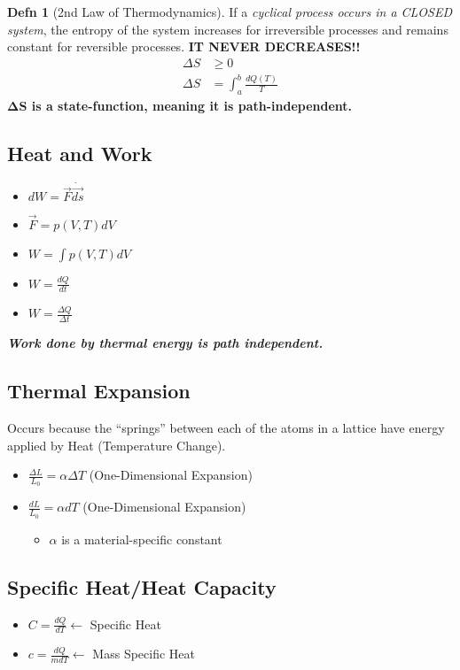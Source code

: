 \documentclass[10pt,letterpaper,final,twoside,notitlepage]{article}
\numberwithin{equation}{section} %
\theoremstyle{definition}
\newtheorem{definition}{Defn}
\theoremstyle{remark}
\begin{document}
		\begin{definition}[2nd Law of Thermodynamics] \label{def:2nd Law of Thermo}
			If a \emph{cyclical process occurs in a CLOSED system}, the entropy of the system increases for irreversible processes and remains constant for reversible processes. \textbf{IT NEVER DECREASES!!}
			\begin{align} \label{eq:2nd Law of Thermo}
				\Delta S &\geq 0 \\
				\Delta S &= \int_{a}^{b} \frac{dQ \left( T \right)}{T} 
			\end{align}
			\textbf{$\mathbf{\Delta S}$ is a state-function, meaning it is path-independent.}
		\end{definition}
	
	\subsection*{Heat and Work} \label{subsec:Heat/Work}
		\begin{itemize}[noitemsep, nolistsep]
			\item $dW = \vec{F} \dot \vec{ds}$
			\item $\vec{F} = p \left( V, T \right) dV$
			\item $W = \int p \left( V, T \right) dV$
			\item $W = \frac{dQ}{dt}$
			\item $W = \frac{\Delta Q}{\Delta t}$
		\end{itemize}
	\emph{\textbf{Work done by thermal energy is path independent.}}

	\subsection*{Thermal Expansion} \label{subsec:Thermal Expansion}
	Occurs because the ``springs'' between each of the atoms in a lattice have energy applied by Heat (Temperature Change).
		\begin{itemize}
			\item $\frac{\Delta L}{L_{0}} = \alpha \Delta T$ (One-Dimensional Expansion)
			\item $\frac{dL}{L_{0}} = \alpha dT$ (One-Dimensional Expansion)
			\begin{itemize}[noitemsep, nolistsep]
				\item $\alpha$ is a material-specific constant
			\end{itemize}
		\end{itemize}
	
	\subsection*{Specific Heat/Heat Capacity} \label{subsec:Specific Heat/Heat Capacity}
		\begin{itemize}
			\item $C = \frac{dQ}{dT} \leftarrow$ Specific Heat
			\item $c = \frac{dQ}{mdT} \leftarrow$ Mass Specific Heat
		\end{itemize}
	
\end{document}
